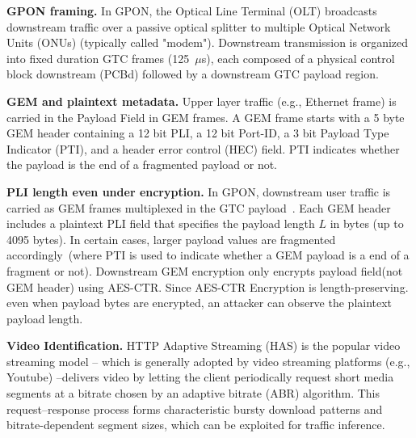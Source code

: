 \documentclass[conference]{IEEEtran}
\begin{document}
\textbf{GPON framing.}
In GPON, the Optical Line Terminal (OLT) broadcasts downstream traffic over a passive optical splitter to multiple Optical Network Units (ONUs) (typically called "modem"). Downstream transmission is organized into fixed duration GTC frames (125~$\mu$s), each composed of a physical control block downstream (PCBd) followed by a downstream GTC payload region.
~\cite{itu-g9843} %

\textbf{GEM and plaintext metadata.}
Upper layer traffic (e.g., Ethernet frame) is carried in the Payload Field in GEM frames. A GEM frame starts with a 5 byte GEM header containing a 12 bit PLI, a 12 bit Port-ID, a 3 bit Payload Type Indicator (PTI), and a header error control (HEC) field. PTI indicates whether the payload is the end of a fragmented payload or not. %
~\cite{itu-g9843} %

\textbf{PLI length even under encryption.}
In GPON, downstream user traffic is carried as GEM frames multiplexed in the GTC payload~\cite{itu-g9843}.
Each GEM header includes a plaintext PLI field that specifies the payload length $L$ in bytes (up to 4095 bytes). In certain cases, larger payload values are fragmented accordingly~\cite{itu-g9843}(where PTI is used to indicate whether a GEM payload is a end of a fragment or not).
Downstream GEM encryption only encrypts payload field(not GEM header) using AES-CTR.
Since AES-CTR Encryption is length-preserving. even when payload bytes are encrypted, an attacker can observe the plaintext payload length.

\textbf{Video Identification.} HTTP Adaptive Streaming (HAS) is the popular video streaming model -- which is generally adopted by video streaming platforms (e.g., Youtube) --delivers video by letting the client periodically request short media segments at a bitrate chosen by an adaptive bitrate (ABR) algorithm. This request--response process forms characteristic bursty download patterns and bitrate-dependent segment sizes, which can be exploited for traffic inference.~\cite{bae-sec22}
\end{document}
